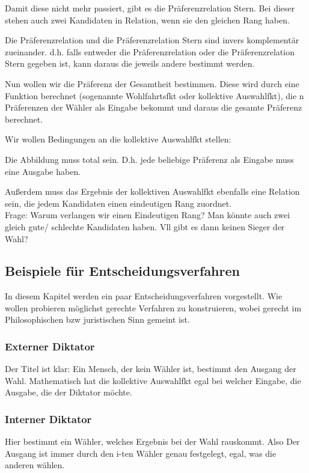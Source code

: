 \documentclass[]{article}
\begin{document}
Damit diese nicht mehr passiert, gibt es die Präferenzrelation Stern. Bei dieser stehen auch zwei Kandidaten in Relation, wenn sie den gleichen Rang haben. 

Die Präferenzrelation und die Präferenzrelation Stern sind invers komplementär zueinander. d.h. falls entweder die Präferenzrelation oder die Präferenzrelation Stern gegeben ist, kann daraus die jeweils andere bestimmt werden. 

Nun wollen wir die Präferenz der Gesamtheit bestimmen. Diese wird durch eine Funktion berechnet (sogenannte Wohlfahrtsfkt oder kollektive Auswahlfkt), die n Präferenzen der Wähler als Eingabe bekommt und daraus die gesamte Präferenz berechnet. 

Wir wollen Bedingungen an die kollektive Auswahlfkt stellen: 

Die Abbildung muss total sein. D.h. jede beliebige Präferenz als Eingabe muss eine Ausgabe haben. 

Außerdem muss das Ergebnis der kollektiven Auswahlfkt ebenfalls eine Relation sein, die jedem Kandidaten einen eindeutigen Rang zuordnet.  \\ 

Frage: Warum verlangen wir einen Eindeutigen Rang? Man könnte auch zwei gleich gute/ schlechte Kandidaten haben. Vll gibt es dann keinen Sieger der Wahl? 

\subsection{Beispiele für Entscheidungsverfahren}

In diesem Kapitel werden ein paar Entscheidungsverfahren vorgestellt. Wie wollen probieren möglichst gerechte Verfahren zu konstruieren, wobei gerecht im Philosophischen bzw juristischen Sinn gemeint ist. 

\subsubsection*{Externer Diktator}

Der Titel ist klar: Ein Mensch, der kein Wähler ist, bestimmt den Ausgang der Wahl. Mathematisch hat die kollektive Auswahlfkt egal bei welcher Eingabe, die Ausgabe, die der Diktator möchte. 

\subsubsection*{Interner Diktator}
Hier bestimmt ein Wähler, welches Ergebnis bei der Wahl rauskommt. Also Der Ausgang ist immer durch den i-ten Wähler genau festgelegt, egal, was die anderen wählen.
\end{document}
